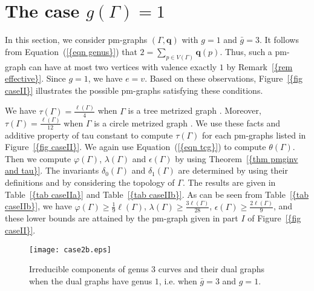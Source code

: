 \documentclass[12pt]{amsart}
\theoremstyle{example}
\theoremstyle{definition}
\theoremstyle{notation}
\begin{document}
\section{The case $g({\Gamma}) = 1$}\label{sec caseII}

In this section, we consider pm-graphs $({\Gamma},{\textbf{q}})$ with $g=1$ and ${\bar{g}} =3$. It follows from {Equation~(\ref{{eqn genus}})}
that $2=\sum_{p \in {V({\Gamma})}}{\textbf{q}} (p)$. Thus, such a pm-graph can have at most two vertices with valence exactly $1$ by {Remark~\ref{{rem effective}}}. Since $g=1$, we have $e=v$. Based on these observations,
{Figure~\ref{{fig caseII}}} illustrates the possible pm-graphs satisfying these conditions.

We have ${\tau(\Gamma)}=\frac{\ell ({\Gamma})}{4}$ when ${\Gamma}$ is a tree metrized graph \cite[Equation 14.3]{BRh}. Moreover, ${\tau(\Gamma)}=\frac{\ell ({\Gamma})}{12}$ when ${\Gamma}$ is a circle metrized graph \cite[Corollary 2.17]{C2}. We use these facts and additive property of tau constant \cite[page 15]{C2} to compute ${\tau(\Gamma)}$ for each pm-graphs listed in {Figure~\ref{{fig caseII}}}. We again use {Equation~(\ref{{eqn tcg}})} to compute ${\theta ({\Gamma})}$. Then we compute ${\varphi ({\Gamma})}$, ${\lambda ({\Gamma})}$ and ${\epsilon({\Gamma})}$ by using {Theorem~\ref{{thm pmginv and tau}}}.
The invariants $\delta_0({\Gamma})$ and $\delta_1({\Gamma})$ are determined by using their definitions and by considering the topology of ${\Gamma}$.
The results are given in {Table~\ref{{tab caseIIa}}} and {Table~\ref{{tab caseIIb}}}. As can be seen from {Table~\ref{{tab caseIIb}}}, we have ${\varphi ({\Gamma})} \geq \frac{1}{9} {\ell ({\Gamma})}$, ${\lambda ({\Gamma})} \geq \frac{3{\ell ({\Gamma})}}{28}$, ${\epsilon({\Gamma})} \geq \frac{2{\ell ({\Gamma})}}{9}$, and these lower bounds are attained by the pm-graph given in part $I$ of {Figure~\ref{{fig caseII}}}.

\begin{figure}
\centering
\texttt{[image: case2b.eps]} \caption{Irreducible components of genus 3 curves and their dual graphs when the dual graphs have genus $1$, i.e. when ${\bar{g}}=3$ and $g=1$.} \label{fig caseII}
\end{figure}
\end{document}
